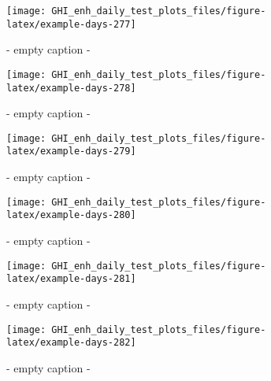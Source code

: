 \documentclass[
  10pt,
  a4paper,oneside]{article}
\begin{document}
\begin{figure}[H]

{\centering \texttt{[image: GHI\_enh\_daily\_test\_plots\_files/figure-latex/example-days-277]} 

}

\caption{ - empty caption - }\label{fig:example-days-277}
\end{figure}

\begin{figure}[H]

{\centering \texttt{[image: GHI\_enh\_daily\_test\_plots\_files/figure-latex/example-days-278]} 

}

\caption{ - empty caption - }\label{fig:example-days-278}
\end{figure}

\begin{figure}[H]

{\centering \texttt{[image: GHI\_enh\_daily\_test\_plots\_files/figure-latex/example-days-279]} 

}

\caption{ - empty caption - }\label{fig:example-days-279}
\end{figure}

\begin{figure}[H]

{\centering \texttt{[image: GHI\_enh\_daily\_test\_plots\_files/figure-latex/example-days-280]} 

}

\caption{ - empty caption - }\label{fig:example-days-280}
\end{figure}

\begin{figure}[H]

{\centering \texttt{[image: GHI\_enh\_daily\_test\_plots\_files/figure-latex/example-days-281]} 

}

\caption{ - empty caption - }\label{fig:example-days-281}
\end{figure}

\begin{figure}[H]

{\centering \texttt{[image: GHI\_enh\_daily\_test\_plots\_files/figure-latex/example-days-282]} 

}

\caption{ - empty caption - }\label{fig:example-days-282}
\end{figure}
\end{document}
